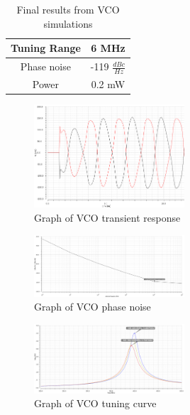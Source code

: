 \begin{table}[h]
\begin{center}
	\begin{tabular}{ |c | c | }
 		\hline                      
  		Tuning Range &  6 MHz \\ \hline
  		Phase noise &  -119 $\frac{dBc}{Hz}$ \\ \hline
		Power & 0.2 mW \\ 
  		\hline  
	\end{tabular}

\end{center}
\caption{Final results from VCO simulations}
\label{tab:vcoresults}
\end{table}

\begin{figure}[h]
   \centering
    \includegraphics[width=0.5\textwidth]{figures/VCOTrans.png}
    \caption{Graph of VCO transient response}
    \label{fig:vcotrans}
\end{figure}

\begin{figure}[h]
   \centering
    \includegraphics[width=0.5\textwidth]{figures/VCOPhaseNoise.png}
    \caption{Graph of VCO phase noise}
    \label{fig:vcophase}
\end{figure}

\begin{figure}[h]
   \centering
    \includegraphics[width=0.5\textwidth]{figures/VCOTuning.png}
    \caption{Graph of VCO tuning curve}
    \label{fig:vcotune}
\end{figure}